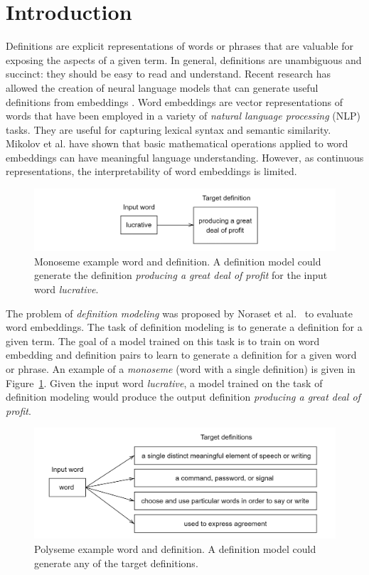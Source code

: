 \section{Introduction}
Definitions are explicit representations of words or phrases that are valuable
for exposing the aspects of a given term. In general, definitions are
unambiguous and succinct: they should be easy to read and understand. Recent research
has allowed the creation of neural language models that can generate useful
definitions from embeddings \cite{bosc_auto_2018, hill_learning_2016, washio_bridging_2019}. Word embeddings are vector representations of words that have been employed in a variety of \textit{natural language
    processing} (NLP) tasks. They are useful for capturing lexical syntax and
semantic similarity. Mikolov et al. \cite{mikolov_distributed_2013} have shown that
basic mathematical operations applied to word embeddings can have meaningful
language understanding. However, as continuous representations, the
interpretability of word embeddings is limited.

\begin{figure}[h]
    \centering
    \includegraphics[width=.9\textwidth]{assets/figures/monoseme.png}
    \caption{Monoseme example word and definition. A definition model could
        generate the definition \textit{producing a great deal of profit} for the
        input word \textit{lucrative}.}
    \label{fig:monoseme}
\end{figure}

The problem of \textit{definition modeling} was proposed by Noraset et al.~\cite{noraset_definition_2016} to evaluate word embeddings. The task of definition modeling is to generate a definition for a given term. The goal of a model trained on this task is to train on word embedding and definition pairs to learn to generate a definition for a given word or phrase. An example of a \textit{monoseme} (word with a single definition) is given in Figure~\ref{fig:monoseme}. Given the input word \textit{lucrative}, a model trained on
the task of definition modeling would produce the output definition
\textit{producing a great deal of profit}.

\begin{figure}[h]
    \centering
    \includegraphics[width=.9\textwidth]{assets/figures/polyseme.png}
    \caption{Polyseme example word and definition. A definition model could generate any of the target definitions.}
    \label{fig:polyseme}
\end{figure}

